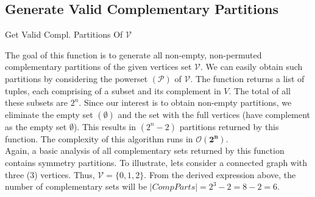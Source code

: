 \documentclass[longpaper, english, final, times]{revdetua}
\begin{document}
		\subsection{Generate Valid Complementary Partitions}
			\begin{algorithm}[h]
				\caption{Get Valid Compl. Partitions Of $\mathcal{V}$}
				\DontPrintSemicolon
				
				
				
			\end{algorithm}
			The goal of this function is to generate all non-empty, non-permuted complementary partitions of the given vertices set $\mathcal{V}$. We can easily obtain such partitions by considering the powerset $(\mathcal{P})$ of $\mathcal{V}$. The function returns a list of tuples, each comprising of a subset and its complement in $V$. The total of all these subsets are $2^n$. Since our interest is to obtain non-empty partitions, we eliminate the empty set $(\emptyset)$ and the set with the full vertices (have complement as the empty set $\emptyset$). This results in $(2^{n}-2)$ partitions returned by this function. The complexity of this algorithm runs in $\mathbf{\mathcal{O}(2^n)}$.\\
			
			Again, a basic analysis of all complementary sets returned by this function contains symmetry partitions. To illustrate, lets consider a connected graph with three (3) vertices. Thus, $\mathcal{V}=\{0,1,2\}$. From the derived expression above, the number of complementary sets will be $|CompParts|=2^3-2=8-2=6$.\\
			
\end{document}
